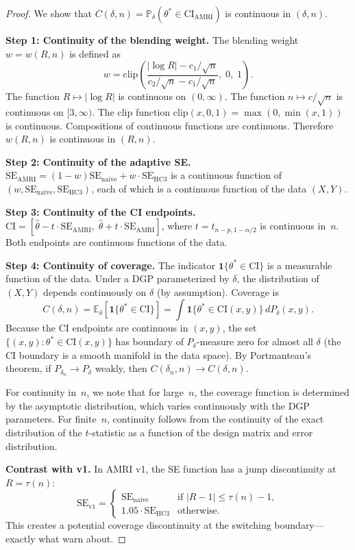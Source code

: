 \documentclass[12pt]{article}
\theoremstyle{definition}
\theoremstyle{remark}
\newcommand{\E}{\mathbb{E}}
\newcommand{\Prob}{\mathbb{P}}
\newcommand{\se}{\mathrm{SE}}
\newcommand{\CI}{\mathrm{CI}}
\begin{document}
\begin{proof}
We show that $C(\delta, n) = \Prob_\delta(\theta^* \in \CI_{\mathrm{AMRI}})$ is continuous in $(\delta, n)$.

\textbf{Step 1: Continuity of the blending weight.}
The blending weight $w = w(R, n)$ is defined as
\[
w = \mathrm{clip}\!\left(\frac{|\log R| - c_1/\sqrt{n}}{c_2/\sqrt{n} - c_1/\sqrt{n}},\; 0,\; 1\right).
\]
The function $R \mapsto |\log R|$ is continuous on $(0, \infty)$. The function $n \mapsto c/\sqrt{n}$ is continuous on $[3, \infty)$. The clip function $\mathrm{clip}(x, 0, 1) = \max(0, \min(x, 1))$ is continuous. Compositions of continuous functions are continuous. Therefore $w(R, n)$ is continuous in $(R, n)$.

\textbf{Step 2: Continuity of the adaptive SE.}
$\se_{\mathrm{AMRI}} = (1 - w) \se_{\mathrm{naive}} + w \cdot \se_{\mathrm{HC3}}$ is a continuous function of $(w, \se_{\mathrm{naive}}, \se_{\mathrm{HC3}})$, each of which is a continuous function of the data $(X, Y)$.

\textbf{Step 3: Continuity of the CI endpoints.}
$\CI = [\hat\theta - t \cdot \se_{\mathrm{AMRI}},\; \hat\theta + t \cdot \se_{\mathrm{AMRI}}]$, where $t = t_{n-p, 1-\alpha/2}$ is continuous in~$n$. Both endpoints are continuous functions of the data.

\textbf{Step 4: Continuity of coverage.}
The indicator $\mathbf{1}\{\theta^* \in \CI\}$ is a measurable function of the data. Under a DGP parameterized by $\delta$, the distribution of $(X, Y)$ depends continuously on $\delta$ (by assumption). Coverage is
\[
C(\delta, n) = \E_\delta\!\left[\mathbf{1}\{\theta^* \in \CI\}\right] = \int \mathbf{1}\{\theta^* \in \CI(x, y)\}\, dP_\delta(x, y).
\]
Because the CI endpoints are continuous in $(x, y)$, the set $\{(x,y) : \theta^* \in \CI(x,y)\}$ has boundary of $P_\delta$-measure zero for almost all $\delta$ (the CI boundary is a smooth manifold in the data space). By Portmanteau's theorem, if $P_{\delta_n} \to P_\delta$ weakly, then $C(\delta_n, n) \to C(\delta, n)$.

For continuity in~$n$, we note that for large~$n$, the coverage function is determined by the asymptotic distribution, which varies continuously with the DGP parameters. For finite~$n$, continuity follows from the continuity of the exact distribution of the $t$-statistic as a function of the design matrix and error distribution.

\textbf{Contrast with v1.}
In AMRI v1, the SE function has a jump discontinuity at $R = \tau(n)$:
\[
\se_{\mathrm{v1}} = \begin{cases} \se_{\mathrm{naive}} & \text{if } |R - 1| \leq \tau(n) - 1, \\ 1.05 \cdot \se_{\mathrm{HC3}} & \text{otherwise.} \end{cases}
\]
This creates a potential coverage discontinuity at the switching boundary---exactly what \citet{leeb2005model} warn about.
\end{proof}
\end{document}
